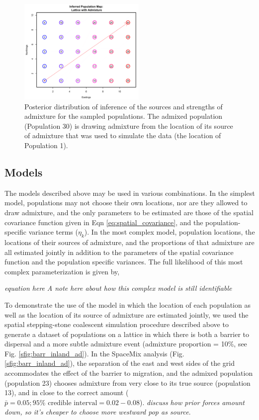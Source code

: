 \documentclass[12pt]{article}
\newcommand{\gb}[1]{{\em \color{magenta} #1}}
\begin{document}
\begin{figure}[ht!]
	\centering
	\includegraphics[width=2.4in,height=2in]{figs/GeoGenMap_corner_admixture_adinf.png}
	\caption{Posterior distribution of inference of the sources and strengths of admixture for the sampled populations.  The admixed population (Population 30) is drawing admixture from the location of its source of admixture that was used to simulate the data (the location of Population 1).}\label{sfig:corner_admixture_just_adinf}
\end{figure}

\subsection*{Models}
The models described above may be used in various combinations.  In the simplest model, populations may not choose their own locations, nor are they allowed to draw admixture, and the only parameters to be estimated are those of the spatial covariance function given in Eqn \eqref{eq:spatial_covariance}, and the population-specific variance terms ($\eta_k$).  In the most complex model, population locations, the locations of their sources of admixture, and the proportions of that admixture are all estimated jointly in addition to the parameters of the spatial covariance function and the population specific variances.  The full likelihood of this most complex parameterization is given by,

\gb{equation here}
\gb{A note here about how this complex model is still identifiable}

To demonstrate the use of the model in which the location of each population as well as the location of its source of admixture are estimated jointly, we used the spatial stepping-stone coalescent simulation procedure described above to generate a dataset of populations on a lattice in which there is both a barrier to dispersal and a more subtle admixture event (admixture proportion = 10\%, see Fig. \ref{sfig:barr_inland_ad}).  In the SpaceMix analysis (Fig. \ref{sfig:barr_inland_ad}), the separation of the east and west sides of the grid accommodates the effect of the barrier to migration, and the admixed population (population 23) chooses admixture from very close to its true source (population 13), and in close to the correct amount ($\bar{p} = 0.05; 95\% \text{ credible interval} = 0.02-0.08$). \gb{discuss how prior forces amount down, so it's cheaper to choose more westward pop as source}.
\end{document}

